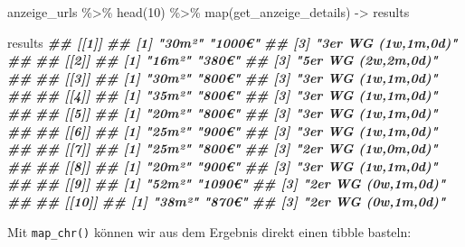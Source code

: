 \documentclass[
  ngerman,
]{article}
\newenvironment{Shaded}{\begin{snugshade}}{\end{snugshade}}
\newcommand{\DecValTok}[1]{\textcolor[rgb]{0.00,0.00,0.81}{#1}}
\newcommand{\DocumentationTok}[1]{\textcolor[rgb]{0.56,0.35,0.01}{\textbf{\textit{#1}}}}
\newcommand{\FunctionTok}[1]{\textcolor[rgb]{0.00,0.00,0.00}{#1}}
\newcommand{\NormalTok}[1]{#1}
\newcommand{\OtherTok}[1]{\textcolor[rgb]{0.56,0.35,0.01}{#1}}
\newcommand{\SpecialCharTok}[1]{\textcolor[rgb]{0.00,0.00,0.00}{#1}}
\begin{document}
\begin{Shaded}
\begin{Highlighting}[]
\NormalTok{anzeige\_urls }\SpecialCharTok{\%\textgreater{}\%}
  \FunctionTok{head}\NormalTok{(}\DecValTok{10}\NormalTok{) }\SpecialCharTok{\%\textgreater{}\%}
  \FunctionTok{map}\NormalTok{(get\_anzeige\_details) }\OtherTok{{-}\textgreater{}}\NormalTok{ results}
 
\NormalTok{results}
\DocumentationTok{\#\# [[1]]}
\DocumentationTok{\#\# [1] "30m²"              "1000€"            }
\DocumentationTok{\#\# [3] "3er WG (1w,1m,0d)"}
\DocumentationTok{\#\# }
\DocumentationTok{\#\# [[2]]}
\DocumentationTok{\#\# [1] "16m²"              "380€"             }
\DocumentationTok{\#\# [3] "5er WG (2w,2m,0d)"}
\DocumentationTok{\#\# }
\DocumentationTok{\#\# [[3]]}
\DocumentationTok{\#\# [1] "30m²"              "800€"             }
\DocumentationTok{\#\# [3] "3er WG (1w,1m,0d)"}
\DocumentationTok{\#\# }
\DocumentationTok{\#\# [[4]]}
\DocumentationTok{\#\# [1] "35m²"              "800€"             }
\DocumentationTok{\#\# [3] "3er WG (1w,1m,0d)"}
\DocumentationTok{\#\# }
\DocumentationTok{\#\# [[5]]}
\DocumentationTok{\#\# [1] "20m²"              "800€"             }
\DocumentationTok{\#\# [3] "3er WG (1w,1m,0d)"}
\DocumentationTok{\#\# }
\DocumentationTok{\#\# [[6]]}
\DocumentationTok{\#\# [1] "25m²"              "900€"             }
\DocumentationTok{\#\# [3] "3er WG (1w,1m,0d)"}
\DocumentationTok{\#\# }
\DocumentationTok{\#\# [[7]]}
\DocumentationTok{\#\# [1] "25m²"              "800€"             }
\DocumentationTok{\#\# [3] "2er WG (1w,0m,0d)"}
\DocumentationTok{\#\# }
\DocumentationTok{\#\# [[8]]}
\DocumentationTok{\#\# [1] "20m²"              "900€"             }
\DocumentationTok{\#\# [3] "3er WG (1w,1m,0d)"}
\DocumentationTok{\#\# }
\DocumentationTok{\#\# [[9]]}
\DocumentationTok{\#\# [1] "52m²"              "1090€"            }
\DocumentationTok{\#\# [3] "2er WG (0w,1m,0d)"}
\DocumentationTok{\#\# }
\DocumentationTok{\#\# [[10]]}
\DocumentationTok{\#\# [1] "38m²"              "870€"             }
\DocumentationTok{\#\# [3] "2er WG (0w,1m,0d)"}
\end{Highlighting}
\end{Shaded}

Mit \texttt{map\_chr()} können wir aus dem Ergebnis direkt einen tibble basteln:
\end{document}
